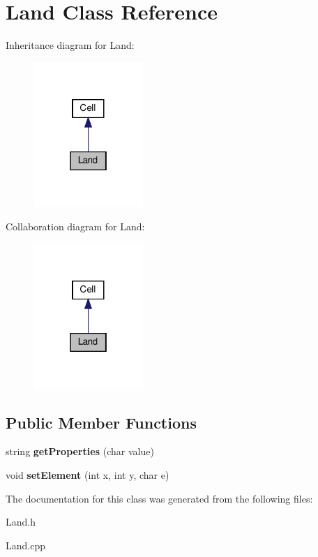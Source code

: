 \hypertarget{classLand}{}\section{Land Class Reference}
\label{classLand}


Inheritance diagram for Land\+:
\nopagebreak
\begin{figure}[H]
\begin{center}
\leavevmode
\includegraphics[width=118pt]{classLand__inherit__graph}
\end{center}
\end{figure}


Collaboration diagram for Land\+:
\nopagebreak
\begin{figure}[H]
\begin{center}
\leavevmode
\includegraphics[width=118pt]{classLand__coll__graph}
\end{center}
\end{figure}
\subsection*{Public Member Functions}
\begin{DoxyCompactItemize}
\item 
\mbox{\label{classLand_a777ba38407550c7868a6082913c56749}} 
string {\bfseries get\+Properties} (char value)
\item 
\mbox{\label{classLand_a9d172fde563a0e66ade4defaa70286db}} 
void {\bfseries set\+Element} (int x, int y, char e)
\end{DoxyCompactItemize}


The documentation for this class was generated from the following files\+:\begin{DoxyCompactItemize}
\item 
Land.\+h\item 
Land.\+cpp\end{DoxyCompactItemize}
